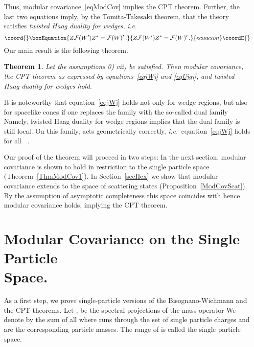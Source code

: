 \documentclass[a4paper,reqno,11pt]{amsart}
\theoremstyle{plain}
\newtheorem{Thm}{Theorem}%
\theoremstyle{definition}
\numberwithin{equation}{section}
\providecommand{\Bb}{\mathbb{R}}
\providecommand{\F}{{\mathcal F}}
\providecommand{\calH}{{\mathcal H}}
\providecommand{\calC}{{\mathcal C}}
\providecommand{\He}{\calH^{(1)}}
\providecommand{\Sec}{\Sigma} %
\renewcommand{\sec}{\alpha}
\providecommand{\Sece}{\Sec^{(1)}} %
\providecommand{\msec}{{m_{\sec}}}
\providecommand{\Ee}{E^{(1)}}
\providecommand{\Emsec}{E_{\{\msec\}}}
\providecommand{\CPTop}{\Theta} %
\providecommand{\cone}{\calC}   %
\begin{document}
Thus, modular covariance~\eqref{eqModCov} implies the CPT
theorem. Further, the last two equations imply, by the Tomita-Takesaki 
theorem, that the theory satisfies {\em twisted Haag duality for wedges}, 
{\em i.e.\ } 
\begin{equation}\coord{}\boxEquation{ \label{eqTHD}
 Z\F(W')Z^* = \F(W)'\,.
}{ Z\F(W')Z^* = \F(W)'\,.
}{ecuacion}\coordE{}\end{equation}
Our main result is the following theorem. 
\begin{Thm} \label{BiWi} 
Let the assumptions 0) \myHighlight{$,\ldots,$}\coordHE{} vii) be satisfied. Then modular 
covariance, 
the CPT theorem as expressed by equations~\eqref{eqjWj} and
\eqref{eqUjgj}, and twisted Haag duality for wedges  hold. 
\end{Thm}
It is noteworthy that equation~\eqref{eqjWj} holds not only for wedge
regions, but also for spacelike cones if one replaces the family \myHighlight{$\F$}\coordHE{} with the
so-called dual family \myHighlight{$\F^d.$}\coordHE{} Namely, twisted Haag duality for wedge
regions implies that the dual family \myHighlight{$\F^d(\cone)\doteq\cap_{W\supset
  \cone}\F(W)$}\coordHE{} is still local. On this family, \myHighlight{$\CPTop$}\coordHE{} acts 
geometrically correctly, {\it i.e.\ }equation~\eqref{eqjWj} holds 
for all \myHighlight{$\F^d(\cone)$}\coordHE{}~\cite{GL}.  

Our proof of the theorem will proceed in two steps: In the next 
section, modular covariance is shown to hold in restriction to the
single particle space (Theorem~\ref{ThmModCov1}). 
In Section~\ref{secHex} we show that modular covariance extends to 
the space of scattering states (Proposition~\ref{ModCovScat}). 
By the assumption of asymptotic
completeness this space coincides with \myHighlight{$\calH,$}\coordHE{} hence modular covariance
holds, implying the CPT theorem. 
\section{Modular Covariance on the Single Particle \\ Space.}  \label{secH1} 
As a first step, we prove single-particle versions of the 
Bisognano-Wichmann and the CPT theorems.  Let \coordHE{}, \myHighlight{$I\subset\Bb,$}\coordHE{} be
the spectral projections of the mass 
operator \coordHE{} We denote by \myHighlight{$\Ee$}\coordHE{} the sum of all \myHighlight{$\Emsec,$}\coordHE{} where 
\myHighlight{$\sec$}\coordHE{} runs through the set \myHighlight{$\Sece$}\coordHE{} of single particle charges   and 
\myHighlight{$m_\sec$}\coordHE{} are the corresponding particle masses. The range of \myHighlight{$\Ee$}\coordHE{} is
called the  single particle space. %
\end{document}
